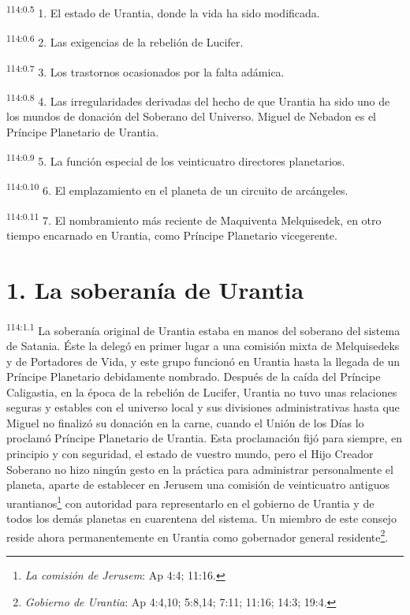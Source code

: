 \documentclass[twoside, 11pt]{book}
\begin{document}
\par
\textsuperscript{114:0.5} 1. El estado de Urantia, donde la vida ha sido modificada.

\par
\textsuperscript{114:0.6} 2. Las exigencias de la rebelión de Lucifer.

\par
\textsuperscript{114:0.7} 3. Los trastornos ocasionados por la falta adámica.

\par
\textsuperscript{114:0.8} 4. Las irregularidades derivadas del hecho de que Urantia ha sido uno de los mundos de donación del Soberano del Universo. Miguel de Nebadon es el Príncipe Planetario de Urantia.

\par
\textsuperscript{114:0.9} 5. La función especial de los veinticuatro directores planetarios.

\par
\textsuperscript{114:0.10} 6. El emplazamiento en el planeta de un circuito de arcángeles.

\par
\textsuperscript{114:0.11} 7. El nombramiento más reciente de Maquiventa Melquisedek, en otro tiempo encarnado en Urantia, como Príncipe Planetario vicegerente.

\section*{1. La soberanía de Urantia}
\par
\textsuperscript{114:1.1} La soberanía original de Urantia estaba en manos del soberano del sistema de Satania. Éste la delegó en primer lugar a una comisión mixta de Melquisedeks y de Portadores de Vida, y este grupo funcionó en Urantia hasta la llegada de un Príncipe Planetario debidamente nombrado. Después de la caída del Príncipe Caligastia, en la época de la rebelión de Lucifer, Urantia no tuvo unas relaciones seguras y estables con el universo local y sus divisiones administrativas hasta que Miguel no finalizó su donación en la carne, cuando el Unión de los Días lo proclamó Príncipe Planetario de Urantia. Esta proclamación fijó para siempre, en principio y con seguridad, el estado de vuestro mundo, pero el Hijo Creador Soberano no hizo ningún gesto en la práctica para administrar personalmente el planeta, aparte de establecer en Jerusem una comisión de veinticuatro antiguos urantianos\footnote{\textit{La comisión de Jerusem}: Ap 4:4; 11:16.} con autoridad para representarlo en el gobierno de Urantia y de todos los demás planetas en cuarentena del sistema. Un miembro de este consejo reside ahora permanentemente en Urantia como gobernador general residente\footnote{\textit{Gobierno de Urantia}: Ap 4:4,10; 5:8,14; 7:11; 11:16; 14:3; 19:4.}.
\end{document}
